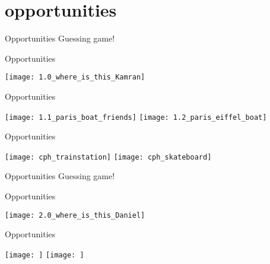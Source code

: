 \section{opportunities}

\begin{frame}{Opportunities}
Guessing game!
\end{frame}

\begin{frame}{Opportunities}
\begin{center}
\texttt{[image: 1.0\_where\_is\_this\_Kamran]}
\end{center}
\end{frame}

\begin{frame}{Opportunities}
\begin{center}
\texttt{[image: 1.1\_paris\_boat\_friends]}
\texttt{[image: 1.2\_paris\_eiffel\_boat]}
\end{center}
\end{frame}

\begin{frame}{Opportunities}
\begin{center}
\texttt{[image: cph\_trainstation]}
\texttt{[image: cph\_skateboard]}
\end{center}
\end{frame}

\begin{frame}{Opportunities}
Guessing game!
\end{frame}

\begin{frame}{Opportunities}
\begin{center}
\texttt{[image: 2.0\_where\_is\_this\_Daniel]}
\end{center}
\end{frame}

\begin{frame}{Opportunities}
\begin{center}
\texttt{[image: ]}
\texttt{[image: ]}
\end{center}
\end{frame}
